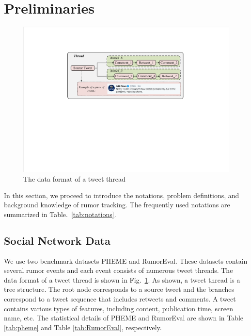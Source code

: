 \section{Preliminaries}
\label{sec:perliminary}

\begin{figure}[tbp]
	\hspace{0ex}
	\vspace{0ex}
	\centering
	\includegraphics[width = \textwidth]{fig/data_format}
	\caption{The data format of a tweet thread}
	\label{fig:data_format}
\end{figure}

In this section, we proceed to introduce the notations, problem definitions, and background knowledge of rumor tracking. The frequently used notations are summarized in Table.~\ref{tab:notations}.

\subsection{Social Network Data}
\label{sec:social_network_data}
We use two benchmark datasets PHEME\cite{DBLP:conf/coling/KochkinaLZ18} and RumorEval\cite{DBLP:conf/semeval/EnayetE17}. These datasets contain several rumor events and each event consists of numerous tweet threads. The data format of a tweet thread is shown in Fig.~\ref{fig:data_format}. As shown, a tweet thread is a tree structure. The root node corresponds to a source tweet and the branches correspond to a tweet sequence that includes retweets and comments. A tweet contains various types of features, including content, publication time, screen name, etc. The statistical details of PHEME and RumorEval are shown in Table \ref{tab:pheme} and Table \ref{tab:RumorEval}, respectively.


